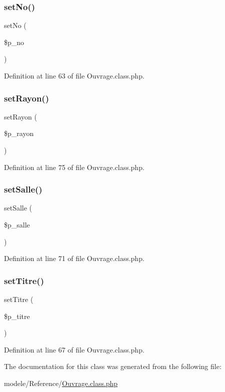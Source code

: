 \subsubsection{\texorpdfstring{set\+No()}{setNo()}}
{\footnotesize\ttfamily set\+No (\begin{DoxyParamCaption}\item[{}]{\$p\+\_\+no }\end{DoxyParamCaption})}



Definition at line 63 of file Ouvrage.\+class.\+php.

\mbox{\label{class_ouvrage_af5ed9ff3b9bc64a656374a71c5b24381}} 
\subsubsection{\texorpdfstring{set\+Rayon()}{setRayon()}}
{\footnotesize\ttfamily set\+Rayon (\begin{DoxyParamCaption}\item[{}]{\$p\+\_\+rayon }\end{DoxyParamCaption})}



Definition at line 75 of file Ouvrage.\+class.\+php.

\mbox{\label{class_ouvrage_ab6d105fe280639505b0dd0c4098517b7}} 
\subsubsection{\texorpdfstring{set\+Salle()}{setSalle()}}
{\footnotesize\ttfamily set\+Salle (\begin{DoxyParamCaption}\item[{}]{\$p\+\_\+salle }\end{DoxyParamCaption})}



Definition at line 71 of file Ouvrage.\+class.\+php.

\mbox{\label{class_ouvrage_a35fb1344f3edd545dac2fa780b93dbe2}} 
\subsubsection{\texorpdfstring{set\+Titre()}{setTitre()}}
{\footnotesize\ttfamily set\+Titre (\begin{DoxyParamCaption}\item[{}]{\$p\+\_\+titre }\end{DoxyParamCaption})}



Definition at line 67 of file Ouvrage.\+class.\+php.



The documentation for this class was generated from the following file\+:\begin{DoxyCompactItemize}
\item 
modele/\+Reference/\hyperlink{_ouvrage_8class_8php}{Ouvrage.\+class.\+php}\end{DoxyCompactItemize}
